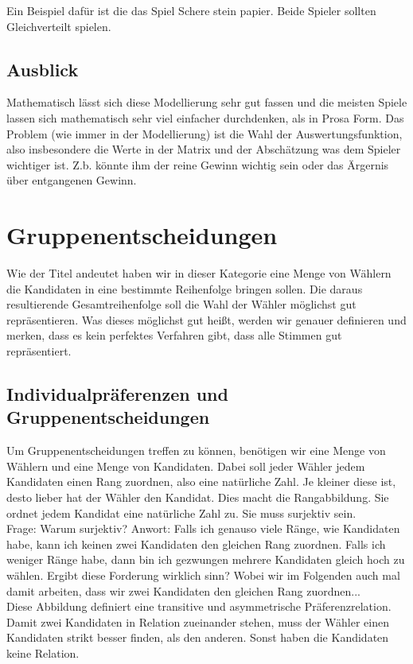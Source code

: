 \documentclass[]{article}
\begin{document}
Ein Beispiel dafür ist die das Spiel Schere stein papier. Beide Spieler sollten Gleichverteilt spielen. 

\subsection{Ausblick}
Mathematisch lässt sich diese Modellierung sehr gut fassen und die meisten Spiele lassen sich mathematisch sehr viel einfacher durchdenken, als in Prosa Form. Das Problem (wie immer in der Modellierung) ist die Wahl der Auswertungsfunktion, also insbesondere die Werte in der Matrix und der Abschätzung was dem Spieler wichtiger ist. Z.b. könnte ihm der reine Gewinn wichtig sein oder das Ärgernis über entgangenen Gewinn.   

\section{Gruppenentscheidungen} 
Wie der Titel andeutet haben wir in dieser Kategorie eine Menge von Wählern die Kandidaten in eine bestimmte Reihenfolge bringen sollen. Die daraus resultierende Gesamtreihenfolge soll die Wahl der Wähler möglichst gut repräsentieren. Was dieses möglichst gut heißt, werden wir genauer definieren und merken, dass es kein perfektes Verfahren gibt, dass alle Stimmen gut repräsentiert. 

\subsection{Individualpräferenzen und Gruppenentscheidungen}

Um Gruppenentscheidungen treffen zu können, benötigen wir eine Menge von Wählern und eine Menge von Kandidaten. Dabei soll jeder Wähler jedem Kandidaten einen Rang zuordnen, also eine natürliche Zahl. Je kleiner diese ist, desto lieber hat der Wähler den Kandidat. Dies macht die Rangabbildung. Sie ordnet jedem Kandidat eine natürliche Zahl zu. Sie muss surjektiv  sein. \\ 

Frage: Warum surjektiv? Anwort: Falls ich genauso viele Ränge, wie Kandidaten habe, kann ich keinen zwei Kandidaten den gleichen Rang zuordnen. Falls ich weniger Ränge habe, dann bin ich gezwungen mehrere Kandidaten gleich hoch zu wählen. Ergibt diese Forderung wirklich sinn? Wobei wir im Folgenden auch mal damit arbeiten, dass wir zwei Kandidaten den gleichen Rang zuordnen... \\ 

Diese Abbildung definiert eine transitive und asymmetrische Präferenzrelation. Damit zwei Kandidaten in Relation zueinander stehen, muss der Wähler einen Kandidaten strikt besser finden, als den anderen. Sonst haben die Kandidaten keine Relation. 
\end{document}
